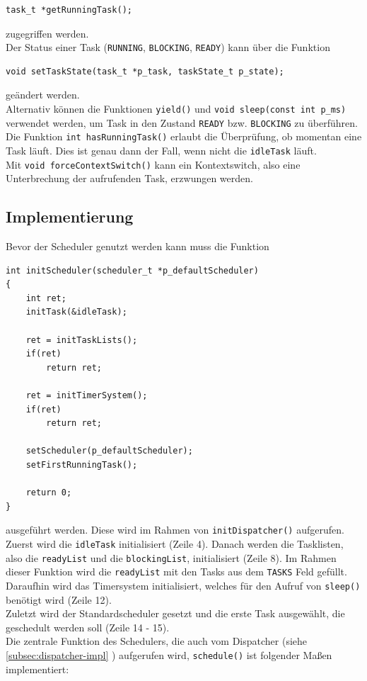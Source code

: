 \documentclass[fontsize=12pt, toc=bibliography, notitlepage]{scrreprt}
\newcommand{\refnn}[1]{\ref{#1} \nameref{#1}}
\begin{document}
\begin{lstlisting}[title=scheduler.h]
task_t *getRunningTask();
\end{lstlisting}

zugegriffen werden.\\

Der Status einer Task (\lstinline$RUNNING$, \lstinline$BLOCKING$, \lstinline$READY$) kann über die Funktion

\begin{lstlisting}[title=scheduler.h]
void setTaskState(task_t *p_task, taskState_t p_state);
\end{lstlisting}

geändert werden.\\
Alternativ können die Funktionen \lstinline$yield()$ und \lstinline$void sleep(const int p_ms)$ verwendet werden, um Task in den Zustand \lstinline$READY$ bzw. \lstinline$BLOCKING$ zu überführen.\\
Die Funktion \lstinline$int hasRunningTask()$ erlaubt die Überprüfung, ob momentan eine Task läuft. Dies ist genau dann der Fall, wenn nicht die \lstinline$idleTask$ läuft.\\
Mit \lstinline$void forceContextSwitch()$ kann ein Kontextswitch, also eine Unterbrechung der aufrufenden Task, erzwungen werden.

\newpage

\subsection{Implementierung}
\label{subsec:scheduler-impl}
Bevor der Scheduler genutzt werden kann muss die Funktion

\begin{lstlisting}[title=scheduler.c]
int initScheduler(scheduler_t *p_defaultScheduler)
{
	int ret;
	initTask(&idleTask);
	
	ret = initTaskLists();
	if(ret)
		return ret;
		
	ret = initTimerSystem();
	if(ret)
		return ret;
		
	setScheduler(p_defaultScheduler);
	setFirstRunningTask();
	
	return 0;
}
\end{lstlisting}

ausgeführt werden. Diese wird im Rahmen von \lstinline$initDispatcher()$ aufgerufen.\\
Zuerst wird die \lstinline$idleTask$ initialisiert (Zeile 4). Danach werden die Tasklisten, also die \lstinline$readyList$ und die \lstinline$blockingList$, initialisiert (Zeile 8). Im Rahmen dieser Funktion wird die \lstinline$readyList$ mit den Tasks aus dem \lstinline$TASKS$ Feld gefüllt.\\
Daraufhin wird das Timersystem initialisiert, welches für den Aufruf von \lstinline$sleep()$ benötigt wird (Zeile 12).\\
Zuletzt wird der Standardscheduler gesetzt und die erste Task ausgewählt, die geschedult werden soll (Zeile 14 - 15).\\
Die zentrale Funktion des Schedulers, die auch vom Dispatcher (siehe \refnn{subsec:dispatcher-impl}) aufgerufen wird, \lstinline$schedule()$ ist folgender Maßen implementiert:
\end{document}
